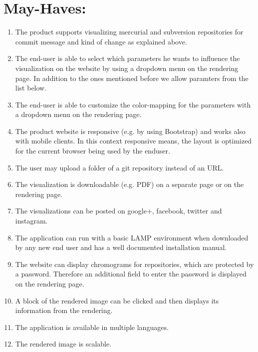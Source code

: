 \documentclass[10pt]{scrartcl}
\begin{document}
\section{May-Haves:}
\begin{enumerate}
\item The product supports visualizing mercurial and subversion repositories for commit message and kind of change as explained above.
\item The end-user is able to select which parameters he wants to influence the visualization on the website by using a dropdown menu on the rendering page. In addition to the ones mentioned before we allow paramters from the list below.
\item The end-user is able to customize the color-mapping for the parameters with  a dropdown menu on the rendering page.
\item The product website is responsive (e.g. by using Bootstrap) and works also with mobile clients. In this context responsive means, the layout is optimized for the current browser being used by the enduser.
\item The user may upload a folder of a git repository instead of an URL.
\item The visualization is downloadable (e.g. PDF) on a separate page or on the rendering page.
\item The visualizations can be posted on google+, facebook, twitter and instagram.
\item The application can run with a basic LAMP environment when downloaded by any new end user and has a well documented installation manual.
\item The website can display chromograms for repositories, which are protected by a password. Therefore an additional field to enter the password is displayed on the rendering page.
\item A block of the rendered image can be clicked and then displays its information from the rendering.
\item The application is available in multiple languages.
\item The rendered image is scalable.
\end{enumerate}
\end{document}
